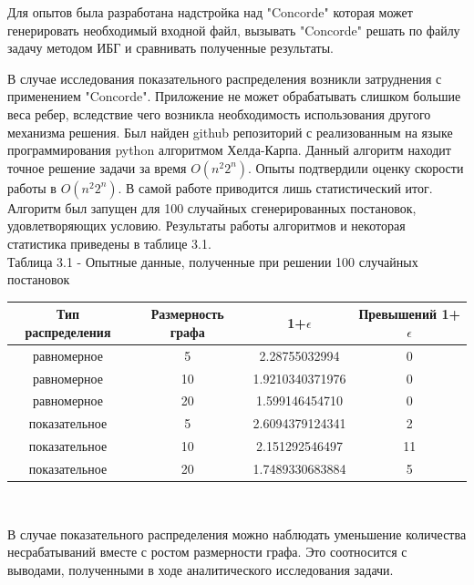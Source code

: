 \documentclass[a4paper, 14pt]{extarticle}
\numberwithin{equation}{section}
\begin{document}
Для опытов была разработана надстройка над "Concorde"  которая может генерировать необходимый входной файл, вызывать "Concorde"  решать по файлу задачу методом ИБГ и сравнивать полученные результаты.

В случае исследования показательного распределения возникли затруднения с применением "Concorde". Приложение не может обрабатывать слишком большие веса ребер, вследствие чего возникла необходимость использования другого механизма решения. Был найден github репозиторий с реализованным на языке программирования python алгоритмом Хелда-Карпа. Данный алгоритм находит точное решение задачи за время $O(n^2 2^n)$. Опыты подтвердили оценку скорости работы в $O(n^2 2^n)$. В самой работе приводится лишь статистический итог. Алгоритм был запущен для 100 случайных сгенерированных постановок, удовлетворяющих условию. Результаты работы алгоритмов и некоторая статистика приведены в таблице 3.1.\\

\noindent Таблица 3.1 - Опытные данные, полученные при решении 100 случайных постановок
\begin{center}
 \begin{tabular}{||c c c c||} 
 \hline
 Тип распределения & Размерность графа  & 1+$\epsilon$  & Превышений 1+$\epsilon$ \\ [0.5ex] 
 \hline\hline
 равномерное & 5 & 2.28755032994 & 0 \\ 
 \hline
 равномерное & 10 & 1.9210340371976 & 0 \\
 \hline
 равномерное & 20 & 1.599146454710 & 0 \\
 \hline
 показательное & 5 & 2.6094379124341 & 2 \\
 \hline
 показательное & 10 & 2.151292546497 & 11 \\
 \hline
 показательное & 20 & 1.7489330683884 & 5 \\ [1ex] 
 \hline
\end{tabular}\\
\end{center}



В случае показательного распределения можно наблюдать уменьшение количества несрабатываний вместе с ростом размерности графа. Это соотносится с выводами, полученными в ходе аналитического исследования задачи. 
\end{document}
